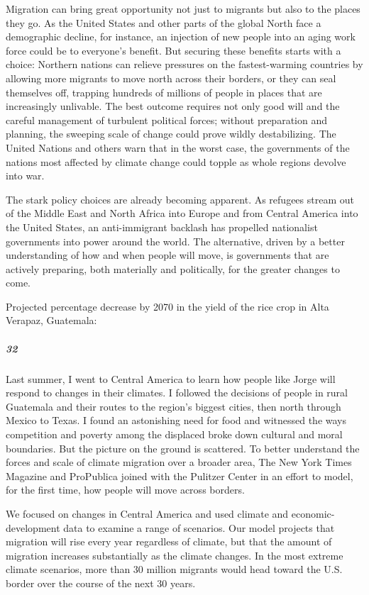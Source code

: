 Migration can bring great opportunity not just to migrants but also to
the places they go. As the United States and other parts of the global
North face a demographic decline, for instance, an injection of new
people into an aging work force could be to everyone's benefit. But
securing these benefits starts with a choice: Northern nations can
relieve pressures on the fastest-warming countries by allowing more
migrants to move north across their borders, or they can seal themselves
off, trapping hundreds of millions of people in places that are
increasingly unlivable. The best outcome requires not only good will and
the careful management of turbulent political forces; without
preparation and planning, the sweeping scale of change could prove
wildly destabilizing. The United Nations and others warn that in the
worst case, the governments of the nations most affected by climate
change could topple as whole regions devolve into war.

The stark policy choices are already becoming apparent. As refugees
stream out of the Middle East and North Africa into Europe and from
Central America into the United States, an anti-immigrant backlash has
propelled nationalist governments into power around the world. The
alternative, driven by a better understanding of how and when people
will move, is governments that are actively preparing, both materially
and politically, for the greater changes to come.

Projected percentage decrease by 2070 in the yield of the rice crop in
Alta Verapaz, Guatemala:

\hypertarget{32}{%
\subparagraph{32}\label{32}}

Last summer, I went to Central America to learn how people like Jorge
will respond to changes in their climates. I followed the decisions of
people in rural Guatemala and their routes to the region's biggest
cities, then north through Mexico to Texas. I found an astonishing need
for food and witnessed the ways competition and poverty among the
displaced broke down cultural and moral boundaries. But the picture on
the ground is scattered. To better understand the forces and scale of
climate migration over a broader area, The New York Times Magazine and
ProPublica joined with the Pulitzer Center in an effort to model, for
the first time, how people will move across borders.

We focused on changes in Central America and used climate and
economic-development data to examine a range of scenarios. Our model
projects that migration will rise every year regardless of climate, but
that the amount of migration increases substantially as the climate
changes. In the most extreme climate scenarios, more than 30 million
migrants would head toward the U.S. border over the course of the next
30 years.


